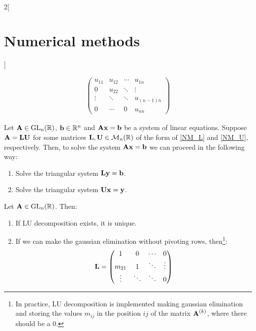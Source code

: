\documentclass[../../../main.tex]{subfiles}
\begin{document}
\begin{multicols}{2}[\section{Numerical methods}]
\begin{definition}[LU descompostion]
\begin{gather}
\begin{pmatrix}
                u_{11} & u_{12} & \cdots & u_{1n}     \\
                0      & u_{22} & \ddots & \vdots     \\
                \vdots & \ddots & \ddots & u_{(n-1)n} \\
                0      & \cdots & 0      & u_{nn}
            \end{pmatrix}
        \end{gather}
    \end{definition}
    \begin{lemma}
        Let $\vectorfunction{A}\in\GL_n(\RR)$, $\vectorfunction{b}\in\RR^n$ and $\vectorfunction{A}\vectorfunction{x}=\vectorfunction{b}$ be a system of linear equations. Suppose $\vectorfunction{A}=\vectorfunction{L}\vectorfunction{U}$ for some matrices $\vectorfunction{L},\vectorfunction{U}\in\mathcal{M}_n(\RR)$ of the form of \eqref{NM_L} and \eqref{NM_U}, respectively. Then, to solve the system $\vectorfunction{A}\vectorfunction{x}=\vectorfunction{b}$ we can proceed in the following way:
        \begin{enumerate}
            \item Solve the triangular system $\vectorfunction{L}\vectorfunction{y}=\vectorfunction{b}$.
            \item Solve the triangular system $\vectorfunction{U}\vectorfunction{x}=\vectorfunction{y}$.
        \end{enumerate}
    \end{lemma}
    \begin{prop}
        Let $\vectorfunction{A}\in\GL_n(\RR)$. Then:
        \begin{enumerate}
            \item If LU decomposition exists, it is unique.
            \item If we can make the gaussian elimination without pivoting rows, then\footnote{In practice, LU decomposition is implemented making gaussian elimination and storing the values $m_{ij}$ in the position $ij$ of the matrix $\vectorfunction{A}^{(k)}$, where there should be a 0.}:
                  $$
                      \vectorfunction{L}=
                      \begin{pmatrix}
                          1      & 0      & \cdots     & 0      \\
                          m_{21} & 1      & \ddots     & \vdots \\
                          \vdots & \ddots & \ddots     & 0      \\

\end{pmatrix}$$
\end{enumerate}
\end{prop}
\end{multicols}
\end{document}
